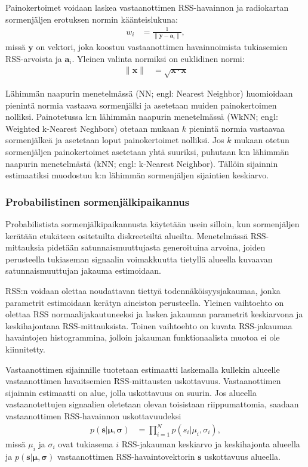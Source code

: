 Painokertoimet voidaan laskea vastaanottimen RSS-havainnon
ja radiokartan sormenjäljen erotuksen normin käänteislukuna:
\begin{align}
  w_i &= \frac{1}{\| \mathbf{y} - \mathbf{a}_i \|},
\end{align}
missä $\mathbf{y}$ on vektori, joka koostuu vastaanottimen havainnoimista
tukiasemien RSS-arvoista ja $\mathbf{a}_i$. Yleinen valinta normiksi on
euklidinen normi:
\begin{align}
  \| \mathbf{x} \| &= \sqrt{\mathbf{x} \cdot \mathbf{x}}
\end{align}

Lähimmän naapurin menetelmässä (NN; engl: Nearest Neighbor) huomioidaan
pienintä normia vastaava sormenjälki ja asetetaan muiden painokertoimen
nolliksi. Painotetussa k:n lähimmän naapurin menetelmässä (WkNN;
engl: Weighted k-Nearest Neghbors) otetaan mukaan $k$ pienintä normia
vastaavaa sormenjälkeä ja asetetaan loput painokertoimet nolliksi. Jos
$k$ mukaan otetun sormenjäljen painokertoimet asetetaan yhtä suuriksi,
puhutaan k:n lähimmän naapurin menetelmästä (kNN; engl: k-Nearest Neighbor).
Tällöin sijainnin estimaatiksi muodostuu k:n lähimmän sormenjäljen
sijaintien keskiarvo.

\subsubsection{Probabilistinen sormenjälkipaikannus}

Probabilistista sormenjälkipaikannusta käytetään usein silloin,
kun sormenjäljen kerätään etukäteen ositetuilta diskreeteiltä alueilta.
Menetelmässä RSS-mittauksia pidetään satunnaismuuttujasta generoituina
arvoina, joiden perusteella tukiaseman signaalin voimakkuutta tietyllä
alueella kuvaavan satunnaismuuttujan jakauma estimoidaan.

RSS:n voidaan olettaa noudattavan tiettyä todennäköisyysjakaumaa, jonka
parametrit estimoidaan kerätyn aineiston perusteella. Yleinen
vaihtoehto on olettaa RSS normaalijakautuneeksi ja laskea jakauman
parametrit keskiarvona ja keskihajontana RSS-mittauksista. Toinen vaihtoehto
on kuvata RSS-jakaumaa havaintojen histogrammina, jolloin jakauman
funktionaalista muotoa ei ole kiinnitetty.

Vastaanottimen sijainnille tuotetaan estimaatti laskemalla kullekin alueelle
vastaanottimen havaitsemien RSS-mittausten uskottavuus. Vastaanottimen
sijainnin estimaatti on alue, jolla uskottavuus on suurin. Jos alueella
vastaanotettujen signaalien oletetaan olevan toisistaan riippumattomia,
saadaan vastaanottimen RSS-havainnon uskottavuudeksi
\begin{align}
  p(\mathbf{s} | \mathbf{\mu},\mathbf{\sigma}) &= 
  \prod_{i=1}^N p(s_i | \mu_i, \sigma_i),
\end{align}
missä $\mu_i$ ja $\sigma_i$ ovat tukiasema $i$ RSS-jakauman keskiarvo ja
keskihajonta alueella ja $p(\mathbf{s}|\mathbf{\mu},\mathbf{\sigma})$
vastaanottimen RSS-havaintovektorin $\mathbf{s}$ uskottavuus alueella.

